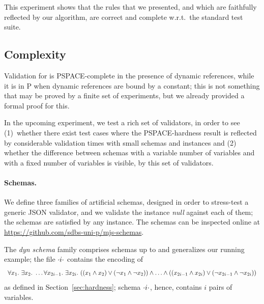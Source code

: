 This experiment shows that the rules that we presented, and which are faithfully reflected by our algorithm,
are correct and complete w.r.t.\ the standard test suite. %

\subsection{Complexity}



%
Validation for {\mJS} is PSPACE-complete in the presence of dynamic references, while it is in P
when dynamic references are bound by a constant; 
this is not something that may be proved by a finite set of experiments, but we already provided a formal proof for this.

In the upcoming experiment, we test a rich set of validators, 
in order to see
(1)~whether there exist test cases where the PSPACE-hardness result is reflected by 
considerable %
validation times with small schemas and instances
and (2) whether the difference between schemas with a variable number of variables and with a fixed number of variables
is visible, by this set of validators.



\paragraph{Schemas.} We define three families of artificial schemas, %
designed in order to stress-test a generic JSON validator, and we validate the %
instance \emph{null} against each of them; the schemas are satisfied by any instance.
The schemas can be inspected online at \protect\url{https://github.com/sdbs-uni-p/mjs-schemas}.

The \emph{dyn schema} family comprises schemas  up to 
 and generalizes our running example;
the file $\cdot i\cdot$ contains the encoding of 
\[
\begin{array}{llllll}
$$\forall x_1.\ \exists x_2.\ \ldots 
\forall x_{2i-1}.\ \exists x_{2i}.\ 
 ((x_{1} \And x_2) \Or (\Not x_{1} \And \Not x_2)) 
\And \ldots \And 
 ((x_{2i-1} \And x_{2i}) \Or (\Not x_{2i-1} \And \Not x_{2i}))
\end{array}
\]
as defined in Section~\ref{sec:hardness}; schema $\cdot i\cdot$, hence, contains $i$ pairs of variables.

